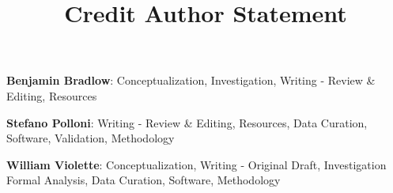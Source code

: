\documentclass{article}
\title{Credit Author Statement}
\author{}
\begin{document}
\maketitle

\textbf{Benjamin Bradlow}: Conceptualization, Investigation, Writing - Review \& Editing, Resources
\medskip

\textbf{Stefano Polloni}: Writing - Review \& Editing, Resources, Data Curation, Software, Validation, Methodology
\medskip

\textbf{William Violette}: Conceptualization, Writing - Original Draft, Investigation Formal Analysis, Data Curation, Software, Methodology
\end{document}
